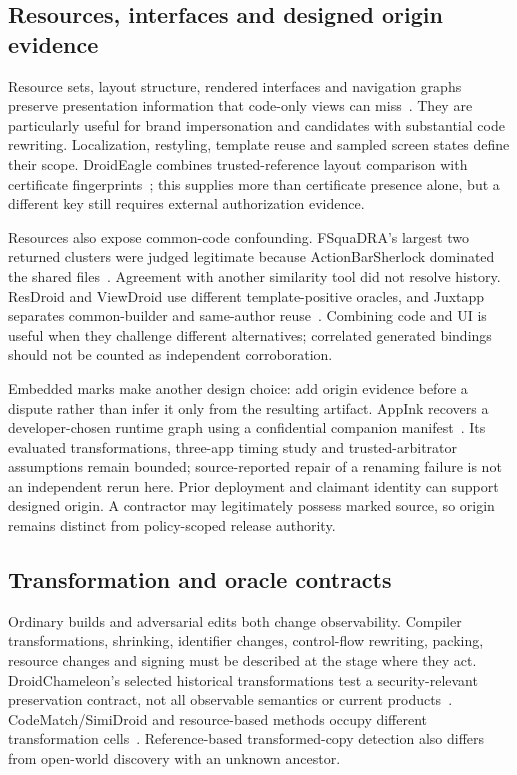 \subsection{Resources, interfaces and designed origin evidence}

Resource sets, layout structure, rendered interfaces and navigation graphs preserve presentation information that code-only views can miss~\cite{resourcedriven,resourceeval,viewdroid}. They are particularly useful for brand impersonation and candidates with substantial code rewriting. Localization, restyling, template reuse and sampled screen states define their scope. DroidEagle combines trusted-reference layout comparison with certificate fingerprints~\cite{droideagle}; this supplies more than certificate presence alone, but a different key still requires external authorization evidence.

Resources also expose common-code confounding. FSquaDRA's largest two returned clusters were judged legitimate because ActionBarSherlock dominated the shared files~\cite{fsquadra}. Agreement with another similarity tool did not resolve history. ResDroid and ViewDroid use different template-positive oracles, and Juxtapp separates common-builder and same-author reuse~\cite{resourcedriven,viewdroid,juxtapp}. Combining code and UI is useful when they challenge different alternatives; correlated generated bindings should not be counted as independent corroboration.

Embedded marks make another design choice: add origin evidence before a dispute rather than infer it only from the resulting artifact. AppInk recovers a developer-chosen runtime graph using a confidential companion manifest~\cite{appink}. Its evaluated transformations, three-app timing study and trusted-arbitrator assumptions remain bounded; source-reported repair of a renaming failure is not an independent rerun here. Prior deployment and claimant identity can support designed origin. A contractor may legitimately possess marked source, so origin remains distinct from policy-scoped release authority.

\subsection{Transformation and oracle contracts}

Ordinary builds and adversarial edits both change observability. Compiler transformations, shrinking, identifier changes, control-flow rewriting, packing, resource changes and signing must be described at the stage where they act. DroidChameleon's selected historical transformations test a security-relevant preservation contract, not all observable semantics or current products~\cite{droidchameleon}. CodeMatch/SimiDroid and resource-based methods occupy different transformation cells~\cite{codematch,simidroid,resourceeval}. Reference-based transformed-copy detection also differs from open-world discovery with an unknown ancestor.

